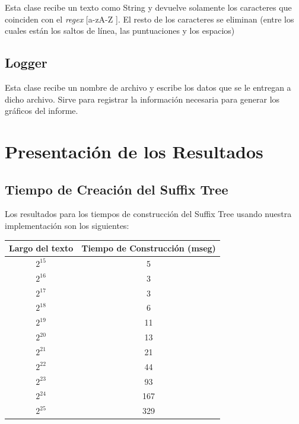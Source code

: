 \documentclass[letterpaper,10pt]{article}
\begin{document}
	Esta clase recibe un texto como String y devuelve solamente los caracteres que coinciden con el \textit{regex} [a-zA-Z ]. El resto de los caracteres se eliminan
	(entre los cuales están los saltos de línea, las puntuaciones y los espacios)

	\subsection{Logger}

	Esta clase recibe un nombre de archivo y escribe los datos que se le entregan a dicho archivo. Sirve para registrar la información necesaria para generar los gráficos del informe.

	\newpage

	\section{Presentación de los Resultados}

	\subsection{Tiempo de Creación del Suffix Tree}

	Los resultados para los tiempos de construcción del Suffix Tree usando nuestra implementación son los siguientes:

	\begin{center}
		\begin{tabular}{|c|c|}
			\hline
			Largo del texto & Tiempo de Construcción (mseg)\\
			\hline
			$2^{15}$ & 5\\
			\hline
			$2^{16}$ & 3\\
			\hline
			$2^{17}$ & 3\\
			\hline
			$2^{18}$ & 6\\
			\hline
			$2^{19}$ & 11\\
			\hline
			$2^{20}$ & 13\\
			\hline
			$2^{21}$ & 21\\
			\hline
			$2^{22}$ & 44\\
			\hline
			$2^{23}$ & 93\\
			\hline
			$2^{24}$ & 167\\
			\hline
			$2^{25}$ & 329\\
			\hline
		\end{tabular}
	\end{center}
\end{document}
